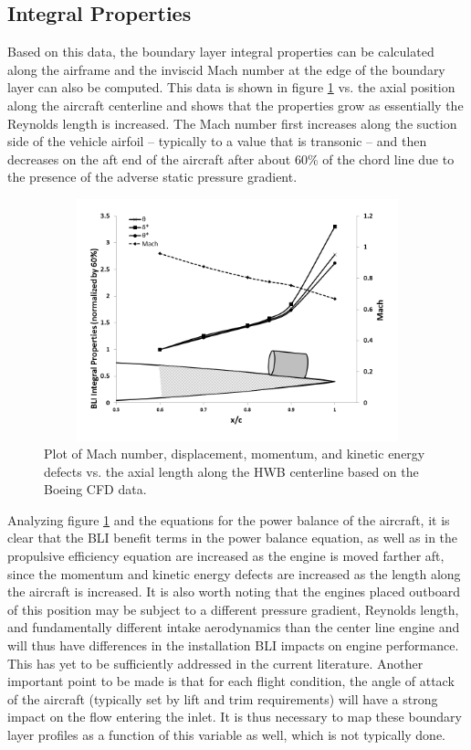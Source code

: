 \documentclass[12pt]{gatech-thesis}
\begin{document}
\subsection{Integral Properties}
\indent Based on this data, the boundary layer integral properties can be calculated along the airframe and the inviscid Mach number at the edge of the boundary layer can also be computed.  This data is shown in figure \ref{Integral_Properties} vs. the axial position along the aircraft centerline and shows that the properties grow as essentially the Reynolds length is increased.  The Mach number first increases along the suction side of the vehicle airfoil -- typically to a value that is transonic -- and then decreases on the aft end of the aircraft after about 60\% of the chord line due to the presence of the adverse static pressure gradient.
	\begin{figure}[htpb]
	\centering
	\includegraphics[width=120mm, height =70mm, clip=true]{Integral_Properties.png}
	\caption{Plot of Mach number, displacement, momentum, and kinetic energy defects vs. the axial length along the HWB centerline based on the Boeing CFD data.}
	\label{Integral_Properties}
	\end{figure}
Analyzing figure \ref{Integral_Properties} and the equations for the power balance of the aircraft, it is clear that the BLI benefit terms in the power balance equation, as well as in the propulsive efficiency equation are increased as the engine is moved farther aft, since the momentum and kinetic energy defects are increased as the length along the aircraft is increased.  It is also worth noting that the engines placed outboard of this position may be subject to a different pressure gradient, Reynolds length, and fundamentally different intake aerodynamics than the center line engine and will thus have differences in the installation BLI impacts on engine performance.  This has yet to be sufficiently addressed in the current literature.
\indent Another important point to be made is that for each flight condition, the angle of attack of the aircraft (typically set by lift and trim requirements) will have a strong impact on the flow entering the inlet.  It is thus necessary to map these boundary layer profiles as a function of this variable as well, which is not typically done.
\end{document}
